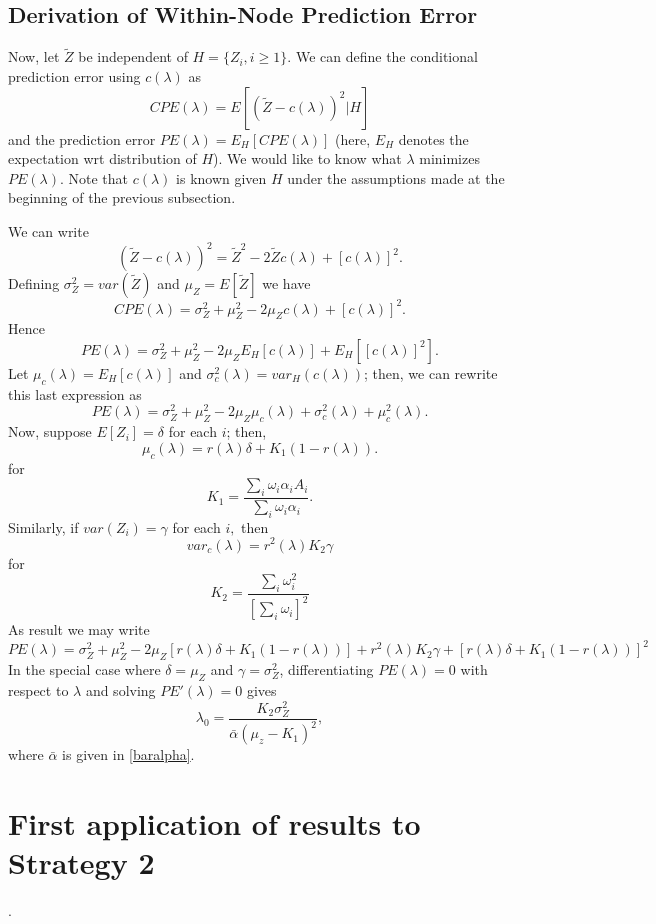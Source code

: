 \documentclass[12pt]{article}
\begin{document}
\subsection{Derivation of Within-Node Prediction Error}
\label{PE}
Now, let $\tilde{Z}$ be independent of $H = \{Z_i, i \geq 1\}.$ We can define the conditional prediction error using $c(\lambda)$
as
\[
CPE(\lambda) = E\left[ (\tilde Z - c(\lambda))^2 | H \right]
\] 
and the prediction error $PE(\lambda) = E_H\left[ CPE(\lambda) \right]$ (here, $E_H$ 
denotes the expectation wrt distribution of $H$).  We would like to know what $\lambda$ 
minimizes $PE(\lambda)$. Note that $c(\lambda)$ is known given $H$ under the assumptions made
at the beginning of the previous subsection.

We can write
\[
(\tilde Z - c(\lambda))^2 = \tilde Z^2 - 2 \tilde Z c(\lambda) + [c(\lambda)]^2.
\]
Defining $\sigma^2_Z = var(\tilde Z)$ and $\mu_Z = E[\tilde Z]$ we have
\[
CPE(\lambda) = \sigma^2_Z + \mu^2_Z - 2 \mu_Z c(\lambda) + [c(\lambda)]^2.
\]
Hence
\[
PE(\lambda) = \sigma^2_Z + \mu^2_Z - 2 \mu_Z E_H[c(\lambda)] + E_H[[c(\lambda)]^2].
\]
Let $\mu_c(\lambda) = E_H[c(\lambda)] $ and $\sigma^2_c(\lambda) = var_H(c(\lambda))$; then, we can rewrite
this last expression as 
\[
PE(\lambda) = \sigma^2_Z + \mu^2_Z - 2 \mu_Z \mu_c(\lambda) + \sigma^2_c(\lambda) + \mu^2_c(\lambda).
\]
Now, suppose $E[Z_i] = \delta$ for each $i$; then,
\[
\mu_c(\lambda) = r(\lambda) \delta+ K_1 (1-r(\lambda)).
\]
for
\[
K_1 =  \frac{ \sum_i \omega_i \alpha_i A_i}{ \sum_i \omega_i \alpha_i }.
\]
Similarly, if $var(Z_i) = \gamma$ for each $i,$ then
\[
var_c(\lambda) = r^2(\lambda) K_2 \gamma
\]
for 
\[
K_2 = \frac{ \sum_i \omega_i^2 }{[ \sum_i \omega_i]^2}
\]
As result we may write
\[
PE(\lambda) = \sigma^2_Z + \mu^2_Z - 2 \mu_Z [r(\lambda) \delta + K_1 (1-r(\lambda)) ] + 
r^2(\lambda) K_2 \gamma + 
[r(\lambda) \delta + K_1 (1-r(\lambda))]^2
\]
In the special case where  $\delta = \mu_Z$ and $\gamma = \sigma^2_Z$, differentiating 
$PE(\lambda) = 0$ with respect to $\lambda$ and solving $PE'(\lambda) = 0$ gives
\begin{equation}
\label{lam-opt}
\lambda_0 = \frac{K_2 \sigma^2_Z}{ \bar{\alpha} (\mu_z - K_1)^2},
\end{equation}
where $\bar \alpha$ is given in \eqref{baralpha}.



\section{First application of results to Strategy 2}.
\end{document}
